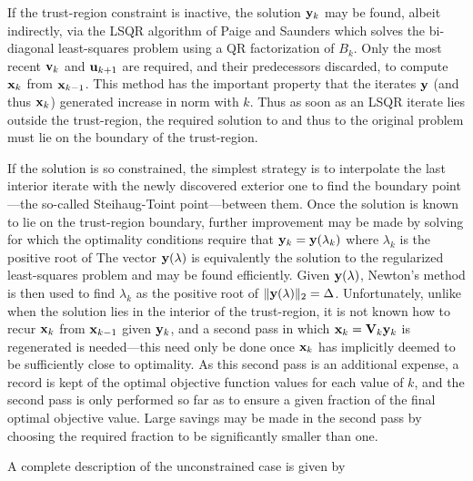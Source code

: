 \documentclass{galahad}
\begin{document}
If the trust-region constraint is inactive, the solution ${\mathbf{y}}_k$
may be found, albeit indirectly, via the LSQR algorithm of Paige and Saunders
which solves the bi-diagonal least-squares problem
using a QR factorization of $B_k$. Only the most recent ${\mathbf{v}}_k$ and ${\mathbf{u}}_{k+1}$
are required, and their predecessors discarded, to compute ${\mathbf{x}}_k$ from
${\mathbf{x}}_{k-1}$. This method has the important property that the iterates
${\mathbf{y}}$ (and thus ${\mathbf{x}}_k$) generated increase in norm with $k$. Thus
as soon as an LSQR iterate lies outside the trust-region, the required solution
to  and thus to the original problem must lie on the boundary of the
trust-region.

If the solution is so constrained, the simplest strategy is to interpolate
the last interior iterate with the newly discovered exterior one to find the
boundary point---the so-called Steihaug-Toint point---between them.
Once the solution is known to lie on the trust-region boundary,
further improvement may be made by solving
for which the optimality conditions require that ${\mathbf{y}}_k = {\mathbf{y}}(\lambda_k)$
where $\lambda_k$ is the positive root of
The vector ${\mathbf{y}}(\lambda)$ is equivalently the solution to the
regularized least-squares problem
and may be found efficiently. Given  ${\mathbf{y}}(\lambda)$, Newton's method
is then used to find $\lambda_k$ as the positive root of
$\|{\mathbf{y}}(\lambda)\|_2 = \Delta$. Unfortunately, unlike when the solution
lies in the interior of the trust-region, it is not known how to recur
${\mathbf{x}}_k$ from ${\mathbf{x}}_{k-1}$ given ${\mathbf{y}}_k$, and a second pass in which
${\mathbf{x}}_k = {\mathbf{V}}_k {\mathbf{y}}_k$ is regenerated is needed---this need only be done
once ${\mathbf{x}}_k$ has implicitly deemed to be sufficiently close to optimality.
As this second pass is an additional expense, a record is kept of the
optimal objective function values for each value of $k$, and the second
pass is only performed so far as to ensure a given fraction of the
final optimal objective value. Large savings may be made in the second
pass by choosing the required fraction to be significantly smaller than one.

\galreferences
A complete description of the unconstrained case is given by
\vspace*{1mm}
\end{document}
